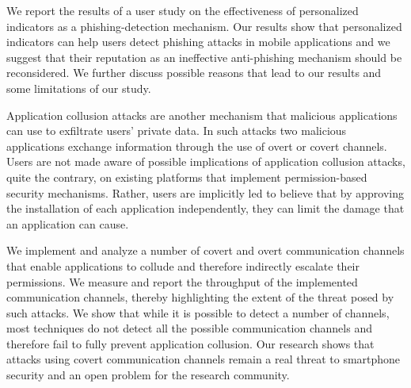 We report the results of a user study on the
effectiveness of personalized indicators as a phishing-detection mechanism. Our
results show that personalized indicators can help users detect phishing
attacks in mobile applications and we suggest that their reputation as an
ineffective anti-phishing mechanism should be reconsidered. We further discuss
possible reasons that lead to our results and some limitations of our study.

Application collusion attacks are another mechanism that malicious applications
can use to exfiltrate users' private data. In such attacks two malicious
applications exchange information through the use of overt or covert channels.
Users are not made aware of possible implications of application collusion
attacks, quite the contrary, on existing platforms that implement
permission-based security mechanisms. Rather, users are implicitly led to
believe that by approving the installation of each application independently,
they can limit the damage that an application can cause.

We implement and analyze a number of covert and overt communication channels
that enable applications to collude and therefore indirectly escalate their
permissions. We measure and report the throughput of the implemented
communication channels, thereby highlighting the extent of the threat posed by
such attacks. We show that while it is possible to detect a number of channels,
most techniques do not detect all the possible communication channels and
therefore fail to fully prevent application collusion. Our research shows that
attacks using covert communication channels remain a real threat to smartphone
security and an open problem for the research community.

